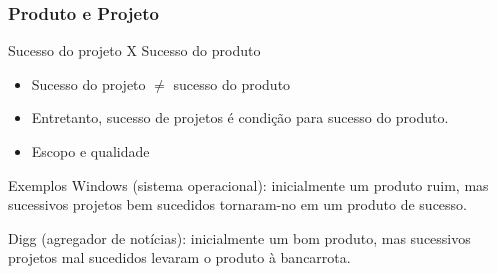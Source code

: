 \begin{frame}
	\frametitle{Produto e Projeto}

	\begin{block:fact}{Sucesso do projeto X Sucesso do produto}
		\begin{itemize}
			\item Sucesso do projeto $\neq$ sucesso do produto
			\item Entretanto, sucesso de projetos é condição para sucesso do produto.
			\item Escopo e qualidade
		\end{itemize}
	\end{block:fact}
	
	\begin{block:ie}{Exemplos}
		Windows (sistema operacional): inicialmente um produto ruim, mas
		sucessivos projetos bem sucedidos tornaram-no em um produto de
		sucesso.
	
		Digg (agregador de notícias): inicialmente um bom produto, mas
		sucessivos projetos mal sucedidos levaram o produto à bancarrota.
	\end{block:ie}
\end{frame}

